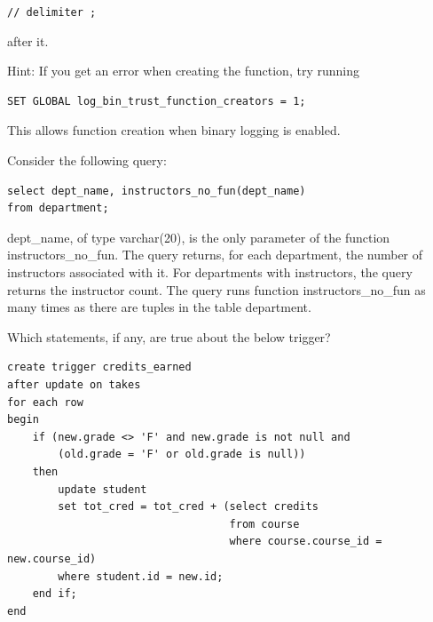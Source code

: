 \documentclass[12pt]{exam}
\begin{document}
\begin{questions}
\begin{minipage}{\linewidth}
{\texttt{// delimiter ;}

after it.}

\par\vspace{0.5em}

{\footnotesize Hint: If you get an error when creating the function, try running}
\begin{verbatim}
SET GLOBAL log_bin_trust_function_creators = 1;
\end{verbatim}
{\footnotesize This allows function creation when binary logging is enabled.}

\par\vspace{0.5em}

Consider the following query:

\begin{verbatim}
select dept_name, instructors_no_fun(dept_name)
from department;
\end{verbatim}

\par\vspace{0.5em}

\begin{checkboxes}
    \CorrectChoice dept\_name, of type varchar(20), is the only parameter of the function instructors\_no\_fun.
    \CorrectChoice The query returns, for each department, the number of instructors associated with it.
    \choice For departments with instructors, the query returns the instructor count.
    \CorrectChoice The query runs function instructors\_no\_fun as many times as there are tuples in the table department.
\end{checkboxes}
\end{minipage}\vspace{1em}

\begin{samepage}
\question[6]
Which statements, if any, are true about the below trigger?\par\vspace{0.5em}
\begin{verbatim}
create trigger credits_earned 
after update on takes
for each row
begin
    if (new.grade <> 'F' and new.grade is not null and 
        (old.grade = 'F' or old.grade is null)) 
    then
        update student
        set tot_cred = tot_cred + (select credits
                                   from course
                                   where course.course_id = new.course_id)
        where student.id = new.id;
    end if;
end
\end{verbatim}


\end{samepage}
\end{questions}
\end{document}
